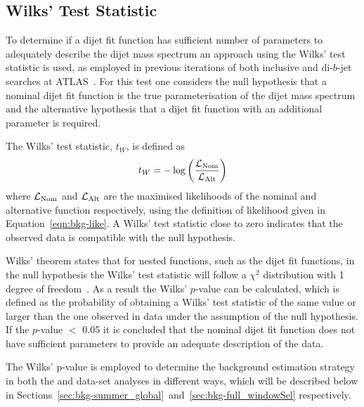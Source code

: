 \subsection{Wilks' Test Statistic} 
\label{sec:bkg-wilks}

To determine if a dijet fit function has sufficient number of parameters to adequately describe the dijet mass spectrum an approach using the Wilks' test statistic is used,
as employed in previous iterations of both inclusive and di-$b$-jet searches at ATLAS~\cite{dijet-mori16_paper,dibjet-mori16_paper}.
For this test one considers the null hypothesis that a nominal dijet fit function is the true parameterisation of the dijet mass spectrum
and the alternative hypothesis that a dijet fit function with an additional parameter is required.

\noindent
The Wilks' test statistic, $t_W$, is defined as
\begin{equation}
  t_{W} = -\log{\left(\frac{\ensuremath{\mathcal{L}}_{\text{Nom}}}{\ensuremath{\mathcal{L}}_{\text{Alt}}}\right)}  \label{eqn:bkg-wilks}
\end{equation}
where $\mathcal{L}_{\text{Nom}}$ and $\mathcal{L}_{\text{Alt}}$ are the maximised likelihoods of the nominal and alternative function respectively,
using the definition of likelihood given in Equation~\ref{eqn:bkg-like}.
A Wilks' test statistic close to zero indicates that the observed data is compatible with the null hypothesis.

Wilks' theorem states that for nested functions, such as the dijet fit functions,
in the null hypothesis the Wilks' test statistic will follow a $\chi^2$ distribution with 1 degree of freedom~\cite{dibjet-wilks}.
As a result the Wilks' $p$-value can be calculated, which is defined as the probability of obtaining a
Wilks' test statistic of the same value or larger than the one observed in data under the assumption of the null hypothesis.
If the \mbox{$p$-value} $<$ 0.05 it is concluded that the nominal dijet fit function does not have sufficient
parameters to provide an adequate description of the data.

The Wilks' p-value is employed to determine the background estimation strategy
in both the \summer{} and \lm{} data-set analyses in different ways,
which will be described below in Sections~\ref{sec:bkg-summer_global}~and~\ref{sec:bkg-full_windowSel} respectively.

